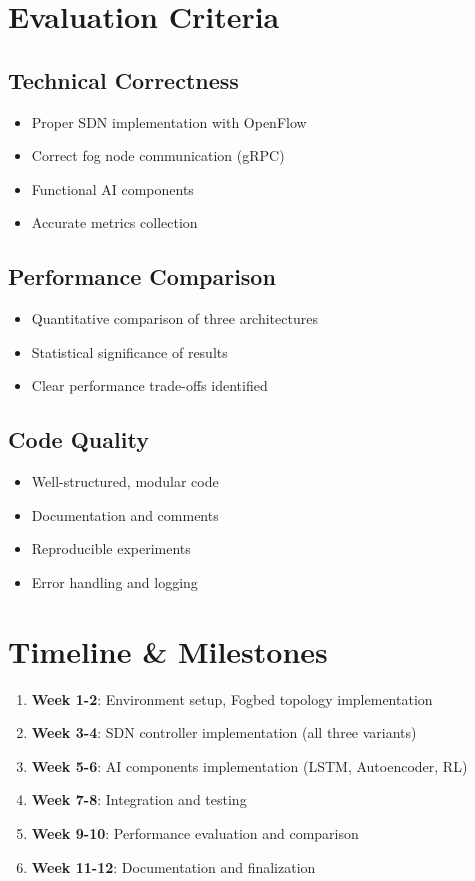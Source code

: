 \documentclass[11pt,a4paper]{article}
\begin{document}
\section{Evaluation Criteria}

\subsection{Technical Correctness}
\begin{itemize}
    \item Proper SDN implementation with OpenFlow
    \item Correct fog node communication (gRPC)
    \item Functional AI components
    \item Accurate metrics collection
\end{itemize}

\subsection{Performance Comparison}
\begin{itemize}
    \item Quantitative comparison of three architectures
    \item Statistical significance of results
    \item Clear performance trade-offs identified
\end{itemize}

\subsection{Code Quality}
\begin{itemize}
    \item Well-structured, modular code
    \item Documentation and comments
    \item Reproducible experiments
    \item Error handling and logging
\end{itemize}

\section{Timeline \& Milestones}

\begin{enumerate}
    \item \textbf{Week 1-2}: Environment setup, Fogbed topology implementation
    \item \textbf{Week 3-4}: SDN controller implementation (all three variants)
    \item \textbf{Week 5-6}: AI components implementation (LSTM, Autoencoder, RL)
    \item \textbf{Week 7-8}: Integration and testing
    \item \textbf{Week 9-10}: Performance evaluation and comparison
    \item \textbf{Week 11-12}: Documentation and finalization
\end{enumerate}
\end{document}
